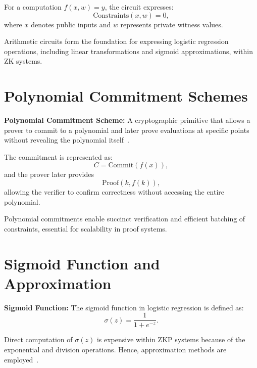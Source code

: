 For a computation $f(x, w) = y$, the circuit expresses:
\begin{equation}
\text{Constraints}(x, w) = 0,
\end{equation}
where $x$ denotes public inputs and $w$ represents private witness values.

\begin{remark}
Arithmetic circuits form the foundation for expressing logistic regression operations, including linear transformations and sigmoid approximations, within ZK systems.
\end{remark}

\section{Polynomial Commitment Schemes}

\begin{definition}\label{def:polycommit}
\textbf{Polynomial Commitment Scheme:} A cryptographic primitive that allows a prover to commit to a polynomial and later prove evaluations at specific points without revealing the polynomial itself~\cite{kates2020plonk}.
\end{definition}

The commitment is represented as:
\begin{equation}
    C = \text{Commit}(f(x)),
\end{equation}
and the prover later provides
\[
\text{Proof}(k, f(k)),
\]
allowing the verifier to confirm correctness without accessing the entire polynomial.

\begin{remark}
Polynomial commitments enable succinct verification and efficient batching of constraints, essential for scalability in proof systems.
\end{remark}

\section{Sigmoid Function and Approximation}

\begin{definition}\label{def:sigmoid}
\textbf{Sigmoid Function:} The sigmoid function in logistic regression is defined as:
\begin{equation}
    \sigma(z) = \frac{1}{1 + e^{-z}}.
\end{equation}
\end{definition}

Direct computation of $\sigma(z)$ is expensive within ZKP systems because of the exponential and division operations. Hence, approximation methods are employed~\cite{cryptoeprint:2025/507}.

